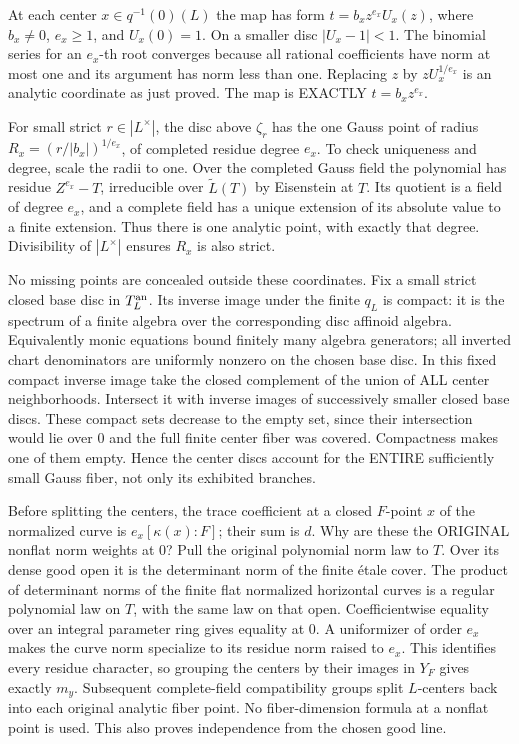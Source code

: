 \documentclass[
  10pt,
]{article}
\begin{document}
At each center \(x\in q^{-1}(0)(L)\) the map has form
\(t=b_xz^{e_x}U_x(z)\), where \(b_x\ne0\), \(e_x\ge1\), and
\(U_x(0)=1\). On a smaller disc \(|U_x-1|<1\). The binomial series for
an \(e_x\)-th root converges because all rational coefficients have norm
at most one and its argument has norm less than one. Replacing \(z\) by
\(zU_x^{1/e_x}\) is an analytic coordinate as just proved. The map is
EXACTLY \(t=b_xz^{e_x}\).

For small strict \(r\in|L^\times|\), the disc above \(\zeta_r\) has the
one Gauss point of radius \(R_x=(r/|b_x|)^{1/e_x}\), of completed
residue degree \(e_x\). To check uniqueness and degree, scale the radii
to one. Over the completed Gauss field the polynomial has residue
\(Z^{e_x}-T\), irreducible over \(\widetilde L(T)\) by Eisenstein at
\(T\). Its quotient is a field of degree \(e_x\), and a complete field
has a unique extension of its absolute value to a finite extension. Thus
there is one analytic point, with exactly that degree. Divisibility of
\(|L^\times|\) ensures \(R_x\) is also strict.

No missing points are concealed outside these coordinates. Fix a small
strict closed base disc in \(T_L^{\rm an}\). Its inverse image under the
finite \(q_L\) is compact: it is the spectrum of a finite algebra over
the corresponding disc affinoid algebra. Equivalently monic equations
bound finitely many algebra generators; all inverted chart denominators
are uniformly nonzero on the chosen base disc. In this fixed compact
inverse image take the closed complement of the union of ALL center
neighborhoods. Intersect it with inverse images of successively smaller
closed base discs. These compact sets decrease to the empty set, since
their intersection would lie over 0 and the full finite center fiber was
covered. Compactness makes one of them empty. Hence the center discs
account for the ENTIRE sufficiently small Gauss fiber, not only its
exhibited branches.

Before splitting the centers, the trace coefficient at a closed
\(F\)-point \(x\) of the normalized curve is \(e_x[\kappa(x):F]\); their
sum is \(d\). Why are these the ORIGINAL nonflat norm weights at 0? Pull
the original polynomial norm law to \(T\). Over its dense good open it
is the determinant norm of the finite étale cover. The product of
determinant norms of the finite flat normalized horizontal curves is a
regular polynomial law on \(T\), with the same law on that open.
Coefficientwise equality over an integral parameter ring gives equality
at 0. A uniformizer of order \(e_x\) makes the curve norm specialize to
its residue norm raised to \(e_x\). This identifies every residue
character, so grouping the centers by their images in \(Y_F\) gives
exactly \(m_y\). Subsequent complete-field compatibility groups split
\(L\)-centers back into each original analytic fiber point. No
fiber-dimension formula at a nonflat point is used. This also proves
independence from the chosen good line.
\end{document}
